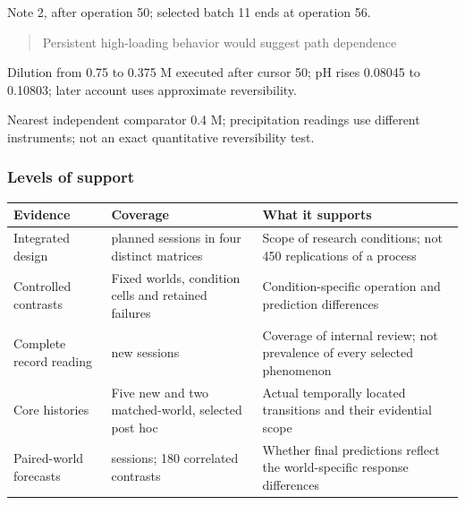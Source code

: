 \documentclass[10pt,a4paper]{article}
\begin{document}
Note 2, after operation 50; selected batch 11 ends at operation 56.

\begin{quote}
Persistent high-loading behavior would suggest path dependence
\end{quote}

Dilution from 0.75 to 0.375 M executed after cursor 50; pH rises 0.08045 to 0.10803; later account uses approximate reversibility.

Nearest independent comparator 0.4 M; precipitation readings use different instruments; not an exact quantitative reversibility test.

\subsubsection{Levels of support}\label{levels-of-support}

{\def\LTcaptype{table} %
\small\begin{longtable}[]{@{}
  >{\raggedright\arraybackslash}p{}
  >{\raggedright\arraybackslash}p{}
  >{\raggedright\arraybackslash}p{}@{}}
\toprule\noalign{}
\begin{minipage}[b]{\linewidth}\raggedright
Evidence
\end{minipage} & \begin{minipage}[b]{\linewidth}\raggedright
Coverage
\end{minipage} & \begin{minipage}[b]{\linewidth}\raggedright
What it supports
\end{minipage} \\
\midrule\noalign{}
\endhead
\bottomrule\noalign{}
\endlastfoot
Integrated design & 450 planned sessions in four distinct matrices & Scope of research conditions; not 450 replications of a process \\
Controlled contrasts & Fixed worlds, condition cells and retained failures & Condition-specific operation and prediction differences \\
Complete record reading & 300 new sessions & Coverage of internal review; not prevalence of every selected phenomenon \\
Core histories & Five new and two matched-world, selected post hoc & Actual temporally located transitions and their evidential scope \\
Paired-world forecasts & 30 sessions; 180 correlated contrasts & Whether final predictions reflect the world-specific response differences \\
\end{longtable}\normalsize
}
\end{document}
